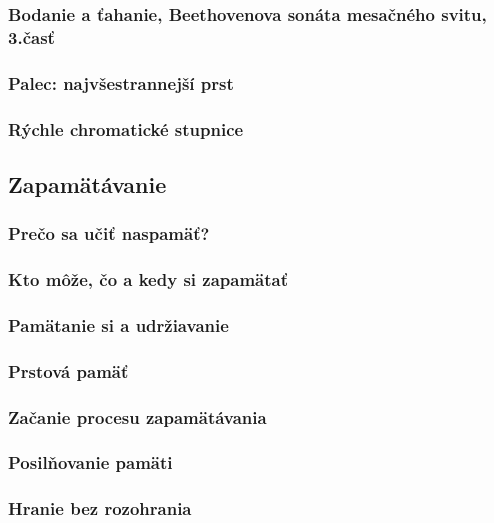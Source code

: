 \subsubsection{Bodanie a ťahanie, Beethovenova sonáta mesačného svitu, 3.časť}

\subsubsection{Palec: najvšestrannejší prst}

\subsubsection{Rýchle chromatické stupnice}

\subsection{Zapamätávanie}

\subsubsection{Prečo sa učiť naspamäť?}

\subsubsection{Kto môže, čo a kedy si zapamätať}

\subsubsection{Pamätanie si a udržiavanie}

\subsubsection{Prstová pamäť}

\subsubsection{Začanie procesu zapamätávania}

\subsubsection{Posilňovanie pamäti}

\subsubsection{Hranie bez rozohrania}

